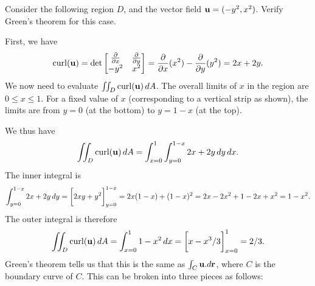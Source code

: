 \documentclass[a4paper]{amsart}
\renewenvironment{solution}{\SolutionInline}{\endSolutionInline}
\begin{document}
\begin{exercise}
 Consider the following region $D$, and the vector field
 $\mathbf{u}=(-y^2,x^2)$.  Verify Green's theorem for this case.
 \begin{center}
 \end{center}
\end{exercise}
\begin{solution}
 First, we have 
 \[ \operatorname{curl}(\mathbf{u}) = 
     \det\left[\begin{matrix} \frac{\partial}{\partial x} & \frac{\partial}{\partial y} \\ -y^2 & x^2 \end{matrix}\right] = 
     \frac{\partial}{\partial x}(x^2) - \frac{\partial}{\partial y}(y^2) = 2x+2y.
 \]
 We now need to evaluate $\iint_D\operatorname{curl}(\mathbf{u})\,dA$.  The overall limits
 of $x$ in the region are $0\leq x\leq 1$.  For a fixed value of $x$
 (corresponding to a vertical strip as shown), the limits are from
 $y=0$ (at the bottom) to $y=1-x$ (at the top).
 \begin{center}
 \end{center}
 We thus have
 \[ \iint_D\operatorname{curl}(\mathbf{u})\,dA =
     \int_{x=0}^1\int_{y=0}^{1-x} 2x+2y\,dy\,dx.
 \]
 The inner integral is
 \[ \int_{y=0}^{1-x} 2x+2y \,dy =
     \CH{2xy+y^2}_{y=0}^{1-x} = 
      2x(1-x)+(1-x)^2 = 2x - 2x^2 + 1 - 2x + x^2 = 1-x^2. 
 \]
 The outer integral is therefore
 \[ \iint_D\curl(\vu)\,dA =
     \int_{x=0}^1 1-x^2 \,dx = 
     \CH{x-x^3/3}_{x=0}^1 = 2/3. 
 \]
 Green's theorem tells us that this is the same as $\int_C\mathbf{u}.d\mathbf{r}$,
 where $C$ is the boundary curve of $C$.  This can be broken into
 three pieces as follows:
 \begin{center}
\end{center}
\end{solution}
\end{document}
